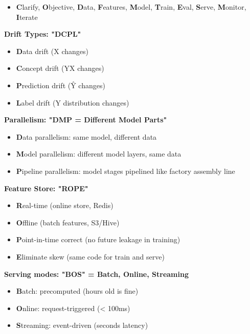 \documentclass[11pt]{article}
\providecommand{\tightlist}{\setlength{\itemsep}{1pt}\setlength{\parskip}{0pt}}
\begin{document}
\begin{itemize}
\tightlist
\item
  \textbf{C}larify, \textbf{O}bjective, \textbf{D}ata, \textbf{F}eatures, \textbf{M}odel, \textbf{T}rain, \textbf{E}val, \textbf{S}erve, \textbf{M}onitor, \textbf{I}terate
\end{itemize}

\textbf{Drift Types: "DCPL"}

\begin{itemize}
\tightlist
\item
  \textbf{D}ata drift (X changes)
\item
  \textbf{C}oncept drift (Y\textbar X changes)
\item
  \textbf{P}rediction drift (Ŷ changes)
\item
  \textbf{L}abel drift (Y distribution changes)
\end{itemize}

\textbf{Parallelism: "DMP = Different Model Parts"}

\begin{itemize}
\tightlist
\item
  \textbf{D}ata parallelism: same model, different data
\item
  \textbf{M}odel parallelism: different model layers, same data
\item
  \textbf{P}ipeline parallelism: model stages pipelined like factory assembly line
\end{itemize}

\textbf{Feature Store: "ROPE"}

\begin{itemize}
\tightlist
\item
  \textbf{R}eal-time (online store, Redis)
\item
  \textbf{O}ffline (batch features, S3/Hive)
\item
  \textbf{P}oint-in-time correct (no future leakage in training)
\item
  \textbf{E}liminate skew (same code for train and serve)
\end{itemize}

\textbf{Serving modes: "BOS" = Batch, Online, Streaming}

\begin{itemize}
\tightlist
\item
  \textbf{B}atch: precomputed (hours old is fine)
\item
  \textbf{O}nline: request-triggered (\textless{} 100ms)
\item
  \textbf{S}treaming: event-driven (seconds latency)
\end{itemize}
\end{document}
